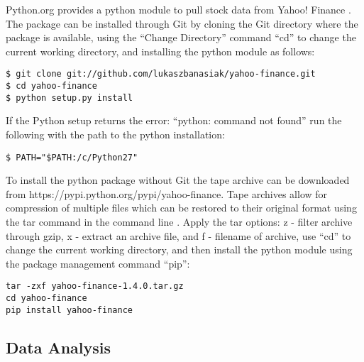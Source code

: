 \documentclass[sigconf]{acmart}
\begin{document}
Python.org provides a python module to pull stock data from Yahoo! Finance \cite{www-python-yahoo}. The package can be installed through Git by cloning the Git directory where the package is available,  using the ``Change Directory'' command ``cd'' to change the current working directory, and installing the python module as follows: 

\begin{mdframed}[style=default]
\begin{lstlisting}
$ git clone git://github.com/lukaszbanasiak/yahoo-finance.git
$ cd yahoo-finance
$ python setup.py install
\end{lstlisting}
\end{mdframed}

If the Python setup returns the error: ``python: command not found'' run the following with the path to the python installation:
\begin{mdframed}[style=default]
\begin{lstlisting}
$ PATH="$PATH:/c/Python27"
\end{lstlisting}
\end{mdframed}

To install the python package without Git the tape archive can be downloaded from https://pypi.python.org/pypi/yahoo-finance. Tape archives allow for compression of multiple files which can be restored to their original format using the tar command in the command line \cite{www-tar}.  Apply the tar options: z - filter archive through gzip, x - extract an archive file, and f - filename of archive, use ``cd'' to change the current working directory, and then install the python module using the package management command ``pip'':
\begin{mdframed}[style=default]
\begin{lstlisting}
tar -zxf yahoo-finance-1.4.0.tar.gz
cd yahoo-finance
pip install yahoo-finance
\end{lstlisting}
\end{mdframed}






\subsection{Data Analysis}

\end{document}
